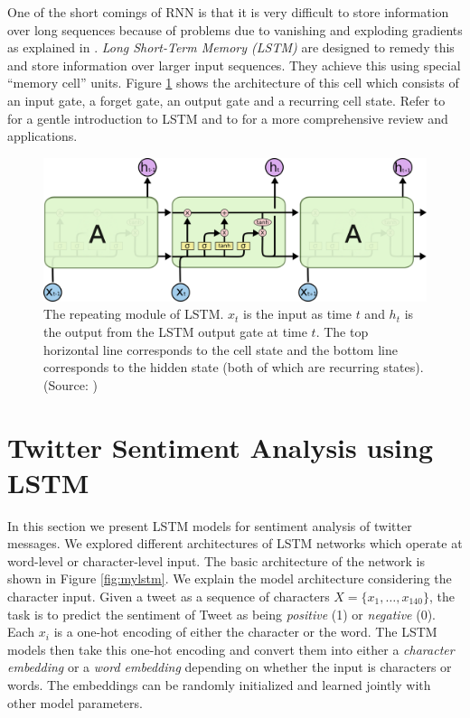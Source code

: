 \documentclass{article} %
\begin{document}
One of the short comings of RNN is that it is very difficult to store information over long sequences because of problems due to vanishing and exploding gradients as explained in \cite{hochreiter2001gradient}.
{\it Long Short-Term Memory (LSTM)} \cite{hochreiter1997long} are designed to remedy this and store information over larger input sequences.
They achieve this using special ``memory cell'' units. 
Figure \ref{fig:lstm} shows the architecture of this cell which consists of an input gate, a forget gate, an output gate and a recurring cell state. 
Refer to \cite{colah} for a gentle introduction to LSTM and to \cite{graves2012supervised} for a more comprehensive review and applications.

\begin{figure}
	\centering
	\includegraphics[width=\textwidth]{figs/LSTM.png}
	\caption{The repeating module of LSTM. $x_t$ is the input as time $t$ and $h_t$ is the output from the LSTM output gate at time $t$. The top horizontal line corresponds to the cell state and the bottom line corresponds to the hidden state (both of which are recurring states).
	(Source: \cite{colah})}
	\label{fig:lstm}
\end{figure}

\section{Twitter Sentiment Analysis using LSTM}
In this section we present LSTM models for sentiment analysis of twitter messages. We explored different architectures of LSTM networks which operate at word-level or character-level input. The basic architecture of the network is shown in Figure \ref{fig:mylstm}.
We explain the model architecture considering the character input.
Given a tweet as a sequence of characters $X=\{x_1, \ldots, x_{140}\}$, the task is to predict the sentiment of Tweet as being {\it positive} (1) or {\it negative} (0). Each $x_i$ is a one-hot encoding of either the character or the word. The LSTM models then take this one-hot encoding and convert them into either a {\it character embedding} or a {\it word embedding} depending on whether the input is characters or words. The embeddings can be randomly initialized and learned jointly with other model parameters.
\end{document}
